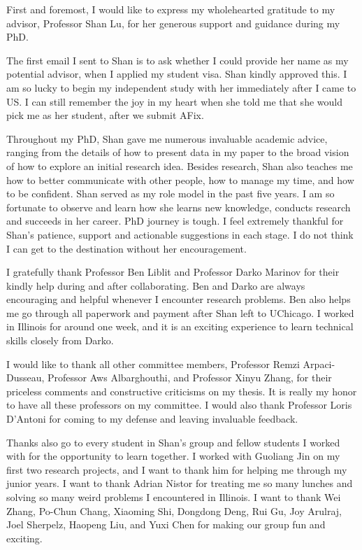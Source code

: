 First and foremost, I would like to express my wholehearted gratitude to my advisor, 
Professor Shan Lu, for her generous support and guidance during my PhD. 

The first email I sent to Shan is to ask whether I could provide her name as my potential advisor, when I applied my student visa. 
Shan kindly approved this. 
I am so lucky to begin my independent study with her immediately after I came to US. 
I can still remember the joy in my heart when she told me that she would pick me as her student, after we submit AFix. 

Throughout my PhD, Shan gave me numerous invaluable academic advice, 
ranging from the details of how to present data in my paper to the broad vision of 
how to explore an initial research idea. 
Besides research, 
Shan also teaches me how to better communicate with other people, 
how to manage my time, and how to be confident. 
Shan served as my role model in the past five years. 
I am so fortunate to observe and learn how she learns new knowledge, 
conducts research and succeeds in her career. 
PhD journey is tough. 
I feel extremely thankful for Shan's patience, support and actionable suggestions in each stage. 
I do not think I can get to the destination without her encouragement. 
 
I gratefully thank Professor Ben Liblit and Professor Darko Marinov for their kindly help during and after collaborating. 
Ben and Darko are always encouraging and helpful whenever I encounter research problems. 
Ben also helps me go through all paperwork and payment after Shan left to UChicago. 
I worked in Illinois for around one week, and it is an exciting experience to learn technical skills closely from Darko. 

I would like to thank all other committee members, Professor Remzi Arpaci-Dusseau, 
Professor Aws Albarghouthi, and Professor Xinyu Zhang, for their priceless comments and constructive criticisms on my thesis. 
It is really my honor to have all these professors on my committee. 
I would also thank Professor Loris D'Antoni for coming to my defense and leaving invaluable feedback. 

Thanks also go to every student in Shan's group and fellow students I worked with for 
the opportunity to learn together. 
I worked with Guoliang Jin on my first two research projects, and I want to thank him for helping me through my junior years. 
I want to thank Adrian Nistor for treating me so many lunches and solving so many weird problems I encountered in Illinois.
I want to thank Wei Zhang, Po-Chun Chang, Xiaoming Shi, Dongdong Deng, Rui Gu, Joy Arulraj, 
Joel Sherpelz, Haopeng Liu, and Yuxi Chen for making our group fun and exciting. 

